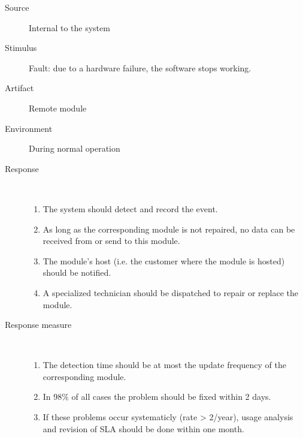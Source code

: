 \begin{description}
	\item[Source] Internal to the system
	\item[Stimulus] Fault: due to a hardware failure, the software stops working.
	\item[Artifact] Remote module 
	\item[Environment] During normal operation 
	\item[Response] \ %
	\begin{enumerate}
	  \item The system should detect and record the event.
	  \item As long as the corresponding module is not repaired, no data can
	  be received from or send to this module.
	  \item The module's host (i.e. the customer where the module is hosted) should
	  be notified.
	  \item A specialized technician should be dispatched to repair or replace the
	  module.
	\end{enumerate}
	\item[Response measure] \ 
	\begin{enumerate}
	  \item The detection time should be at most the update frequency of the
	  corresponding module.
	  \item In 98\% of all cases the problem should be fixed within 2 days.
	  \item If these problems occur systematicly (rate > 2/year), usage
	  analysis and revision of SLA should be done within one month.
	\end{enumerate}
\end{description}